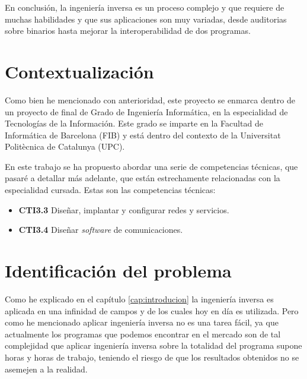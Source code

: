 En conclusión, la ingeniería inversa es un proceso complejo y que requiere de muchas habilidades y que sus aplicaciones son muy variadas, desde auditorias sobre binarios hasta mejorar
la interoperabilidad de dos programas.

\section{Contextualización}
\label{sec:contextualizacion}


Como bien he mencionado con anterioridad, este proyecto se enmarca dentro de un proyecto de final de Grado de Ingeniería Informática, en la especialidad de Tecnologías de la Información.
Este grado se imparte en la Facultad de Informática de Barcelona (FIB) y está dentro del contexto de la Universitat Politècnica de Catalunya (UPC).

En este trabajo se ha propuesto abordar una serie de competencias técnicas, que pasaré a detallar más adelante, que están estrechamente relacionadas con la especialidad cursada. Estas
son las competencias técnicas:

\begin{itemize}
    \item \textbf{CTI3.3} Diseñar, implantar y configurar redes y servicios.
    \item \textbf{CTI3.4} Diseñar \textit{software} de comunicaciones.
\end{itemize}

\section{Identificación del problema}
\label{sec:problema}


Como he explicado en el capítulo \ref{cap:introducion} la ingeniería inversa es aplicada en una infinidad de campos y de los cuales hoy en día es utilizada. Pero como he mencionado
aplicar ingeniería inversa no es una tarea fácil, ya que actualmente los programas que podemos encontrar en el mercado son de tal complejidad que aplicar ingeniería inversa sobre la
totalidad del programa supone horas y horas de trabajo, teniendo el riesgo de que los resultados obtenidos no se asemejen a la realidad.

